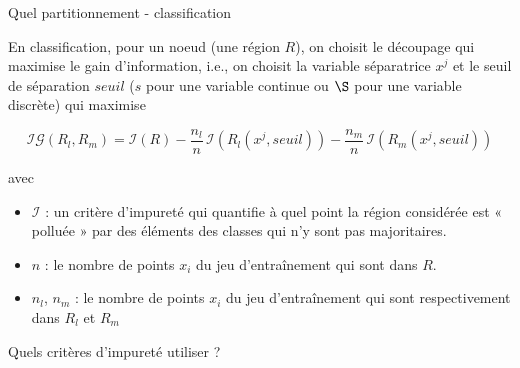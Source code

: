 \documentclass[10pt]{beamer}
\begin{document}
\begin{frame}{Quel partitionnement - classification}

	 En classification, pour un noeud (une région $R$), on choisit le découpage qui maximise le gain d'information, i.e., on choisit la variable séparatrice $x^j$ et le seuil de séparation $seuil$ ($s$ pour une variable continue ou $\S$ pour une variable discrète) qui maximise
		
		$$\mathcal{IG}(R_l, R_m)=\mathcal{I}(R)-\frac{n_l}{n} \,\mathcal{I}\left(R_{l}(x^j, seuil)\right)-\frac{n_m}{n} \,\mathcal{I}\left(R_m(x^j, seuil)\right)$$
		
	avec
	\begin{itemize}
		\item 	$\mathcal{I}$ : un critère d'impureté qui quantifie à quel point la région considérée est « polluée » par des éléments des classes qui n’y sont pas majoritaires.\\[0.5em]
		\item  $n$ : le nombre de points $x_i$ du jeu d'entraînement qui sont dans $R$.
		\item  $n_l$, $n_m$ : le nombre de points $x_i$ du jeu d'entraînement qui sont respectivement dans $R_l$ et $R_m$
	\end{itemize}	
	
		\vspace*{3em}
	\begin{vblock}{}\centering
	 Quels critères d'impureté utiliser ?
	\end{vblock}
		
\end{frame}
\end{document}
